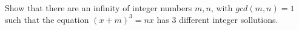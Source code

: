 Show that there are an infinity of integer numbers \(m,n\), with \(gcd(m,n)=1\) such that the equation \((x+m)^{3}=nx\) has 3 different integer sollutions.